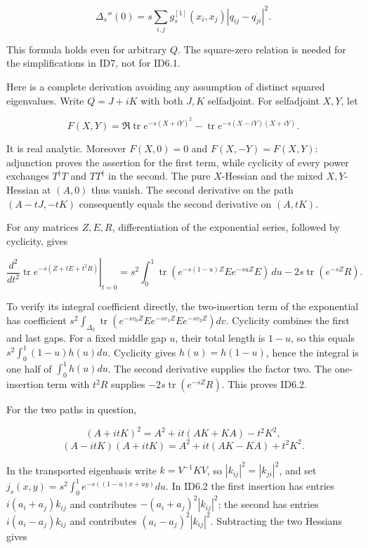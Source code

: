 \[
\boxed{\Delta_s''(0)
=s\sum_{i,j}g_s^{[1]}(x_i,x_j)
|q_{ij}-\overline{q_{ji}}|^2.} \tag{ID6.1}
\]

This formula holds even for arbitrary \(Q\). The square-zero relation is needed for the simplifications in ID7, not for ID6.1.

Here is a complete derivation avoiding any assumption of distinct squared eigenvalues. Write \(Q=J+iK\) with both \(J,K\) selfadjoint. For selfadjoint \(X,Y\), let

\[
F(X,Y)=\Re\operatorname{tr}e^{-s(X+iY)^2}
-\operatorname{tr}e^{-s(X-iY)(X+iY)}.
\]

It is real analytic. Moreover \(F(X,0)=0\) and \(F(X,-Y)=F(X,Y)\): adjunction proves the assertion for the first term, while cyclicity of every power exchanges \(T^\dagger T\) and \(TT^\dagger\) in the second. The pure \(X\)-Hessian and the mixed \(X,Y\)-Hessian at \((A,0)\) thus vanish. The second derivative on the path \((A-tJ,-tK)\) consequently equals the second derivative on \((A,tK)\).

For any matrices \(Z,E,R\), differentiation of the exponential series, followed by cyclicity, gives

\[
\left.\frac{d^2}{dt^2}\operatorname{tr}e^{-s(Z+tE+t^2R)}\right|_{t=0}
=s^2\int_0^1\operatorname{tr}(e^{-s(1-u)Z}E e^{-suZ}E)\,du
-2s\operatorname{tr}(e^{-sZ}R). \tag{ID6.2}
\]

To verify its integral coefficient directly, the two-insertion term of the exponential has coefficient \(s^2\int_{\Delta_2}\operatorname{tr}
(e^{-sv_0Z}E e^{-sv_1Z}E e^{-sv_2Z})dv\). Cyclicity combines the first and last gaps. For a fixed middle gap \(u\), their total length is \(1-u\), so this equals \(s^2\int_0^1(1-u)h(u)du\). Cyclicity gives \(h(u)=h(1-u)\), hence the integral is one half of \(\int_0^1h(u)du\). The second derivative supplies the factor two. The one-insertion term with \(t^2R\) supplies \(-2s\operatorname{tr}(e^{-sZ}R)\). This proves ID6.2.

For the two paths in question,

\[
(A+itK)^2=A^2+it(AK+KA)-t^2K^2,
\] \[
(A-itK)(A+itK)=A^2+it(AK-KA)+t^2K^2.
\]

In the transported eigenbasis write \(k=V^{-1}KV\), so \(|k_{ij}|^2=|k_{ji}|^2\), and set \(j_s(x,y)=s^2\int_0^1e^{-s((1-u)x+uy)}du\). In ID6.2 the first insertion has entries \(i(a_i+a_j)k_{ij}\) and contributes \(-(a_i+a_j)^2|k_{ij}|^2\); the second has entries \(i(a_i-a_j)k_{ij}\) and contributes \((a_i-a_j)^2|k_{ij}|^2\). Subtracting the two Hessians gives

